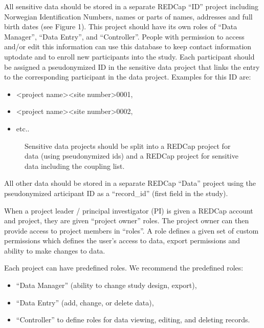 \documentclass[letterpaper,10pt,english]{sphinxmanual}
\begin{document}
\sphinxAtStartPar
All sensitive data should be stored in a separate REDCap “ID” project including Norwegian Identification Numbers, names or parts of names, addresses and full birth dates (see Figure 1). This project should have its own roles of “Data Manager”, “Data Entry”, and “Controller”. People with permission to access and/or edit this information can use this database to keep contact information up\sphinxhyphen{}to\sphinxhyphen{}date and to enroll new participants into the study. Each participant should be assigned a pseudonymized ID in the sensitive data project that links the entry to the corresponding participant in the data project. Examples for this ID are:
\begin{itemize}
\item {} 
\sphinxAtStartPar
\textless{}project name\textgreater{}\sphinxhyphen{}\textless{}site number\textgreater{}\sphinxhyphen{}0001,

\item {} 
\sphinxAtStartPar
\textless{}project name\textgreater{}\sphinxhyphen{}\textless{}site number\textgreater{}\sphinxhyphen{}0002,

\item {} 
\sphinxAtStartPar
etc..

\end{itemize}

\begin{figure}[htbp]
\centering
\capstart

\noindent{}
\caption{Sensitive data projects should be split into a REDCap project for data (using pseudonymized ids) and a REDCap project for sensitive data including the coupling list.}\label{\detokenize{EndUser/index:id3}}\end{figure}

\sphinxAtStartPar
All other data should be stored in a separate REDCap “Data” project using the pseudonymized articipant ID as a “record\_id” (first field in the study).

\sphinxAtStartPar
{}

\sphinxAtStartPar
When a project leader / principal investigator (PI) is given a REDCap account and project, they are given “project owner” roles. The project owner can then provide access to project members in “roles”. A role defines a given set of custom permissions which defines the user’s access to data, export permissions and ability to make changes to data.

\sphinxAtStartPar
Each project can have predefined roles. We recommend the predefined roles:
\begin{itemize}
\item {} 
\sphinxAtStartPar
“Data Manager” (ability to change study design, export),

\item {} 
\sphinxAtStartPar
“Data Entry” (add, change, or delete data),

\item {} 
\sphinxAtStartPar
“Controller” to define roles for data viewing, editing, and deleting records.

\end{itemize}
\end{document}
